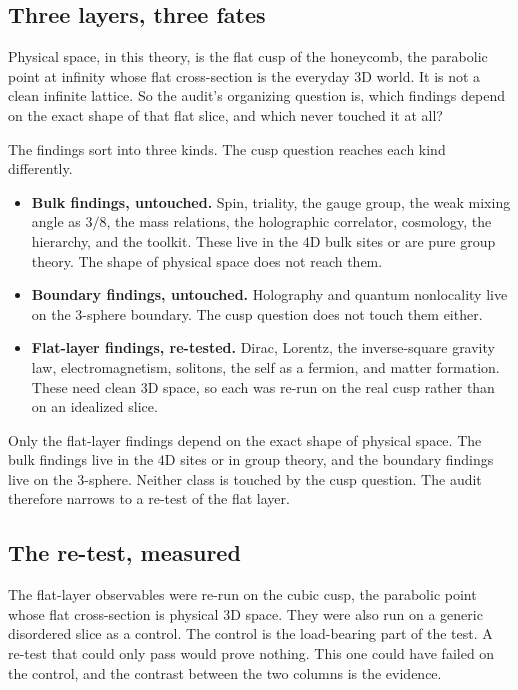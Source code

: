 \subsection{Three layers, three fates}

Physical space, in this theory, is the flat cusp of the honeycomb, the parabolic point at infinity whose flat cross-section is the everyday $3$D world. It is not a clean infinite lattice. So the audit's organizing question is, which findings depend on the exact shape of that flat slice, and which never touched it at all?

The findings sort into three kinds. The cusp question reaches each kind differently.

\begin{itemize}
\item \textbf{Bulk findings, untouched.} Spin, triality, the gauge group, the weak mixing angle as $3/8$, the mass relations, the holographic correlator, cosmology, the hierarchy, and the toolkit. These live in the $4$D bulk sites or are pure group theory. The shape of physical space does not reach them.
\item \textbf{Boundary findings, untouched.} Holography and quantum nonlocality live on the $3$-sphere boundary. The cusp question does not touch them either.
\item \textbf{Flat-layer findings, re-tested.} Dirac, Lorentz, the inverse-square gravity law, electromagnetism, solitons, the self as a fermion, and matter formation. These need clean $3$D space, so each was re-run on the real cusp rather than on an idealized slice.
\end{itemize}

\begin{result}
Only the flat-layer findings depend on the exact shape of physical space. The bulk findings live in the $4$D sites or in group theory, and the boundary findings live on the $3$-sphere. Neither class is touched by the cusp question. The audit therefore narrows to a re-test of the flat layer.
\end{result}

\subsection{The re-test, measured}

The flat-layer observables were re-run on the cubic cusp, the parabolic point whose flat cross-section is physical $3$D space. They were also run on a generic disordered slice as a control. The control is the load-bearing part of the test. A re-test that could only pass would prove nothing. This one could have failed on the control, and the contrast between the two columns is the evidence.

